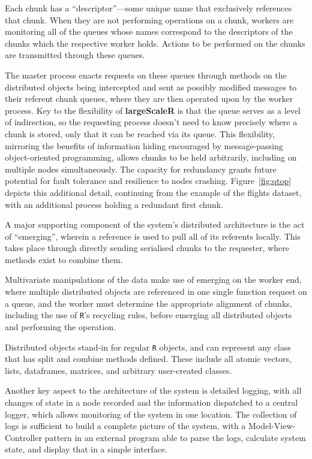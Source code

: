 Each chunk has a ``descriptor''---some unique name that exclusively references that chunk.
When they are not performing operations on a chunk, workers are monitoring all of the queues whose names correspond to the descriptors of the chunks which the respective worker holds.
Actions to be performed on the chunks are transmitted through these queues.

The master process enacts requests on these queues through methods on the distributed objects being intercepted and sent as possibly modified messages to their referent chunk queues, where they are then operated upon by the worker process.
Key to the flexibility of \textbf{largeScaleR} is that the queue serves as a level of indirection, so the requesting process doesn't need to know precisely where a chunk is stored, only that it can be reached via its queue.
This flexibility, mirroring the benefits of information hiding encouraged by message-passing object-oriented programming, allows chunks to be held arbitrarily, including on multiple nodes simultaneously.
The capacity for redundancy grants future potential for fault tolerance and resilience to nodes crashing.
Figure~\ref{fig:qtop} depicts this additional detail, continuing from the example of the flights dataset, with an additional process holding a redundant first chunk.



A major supporting component of the system's distributed architecture is the act of ``emerging'', wherein a reference is used to pull all of its referents locally\cite{emmerich2000engineering}.
This takes place through directly sending serialised chunks to the requester, where methods exist to combine them.

Multivariate manipulations of the data make use of emerging on the worker end, where multiple distributed objects are referenced in one single function request on a queue, and the worker must determine the appropriate alignment of chunks, including the use of \texttt{R}'s recycling rules, before emerging all distributed objects and performing the operation.

Distributed objects stand-in for regular \texttt{R} objects, and can represent any class that has split and combine methods defined.
These include all atomic vectors, lists, dataframes, matrices, and arbitrary user-created classes.

Another key aspect to the architecture of the system is detailed logging, with all changes of state in a node recorded and the information dispatched to a central logger, which allows monitoring of the system in one location. The collection of logs is sufficient to build a complete picture of the system, with a Model-View-Controller pattern in an external program able to parse the logs, calculate system state, and display that in a simple interface\cite{gamma1995design}.

